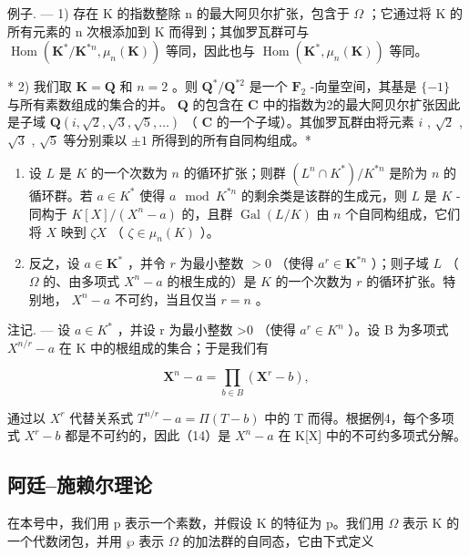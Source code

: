 例子. --- 1) 存在 K 的指数整除 n 的最大阿贝尔扩张，包含于 \(\Omega\) ；它通过将 K 的所有元素的 n 次根添加到 K 而得到；其伽罗瓦群可与 \(\operatorname{Hom}(\mathbf{K}^{*}/\mathbf{K}^{*n}, \mu_{n}(\mathbf{K}))\) 等同，因此也与 \(\operatorname{Hom}(\mathbf{K}^{*}, \mu_{n}(\mathbf{K}))\) 等同。

* 2) 我们取 \(\mathbf{K} = \mathbf{Q}\) 和 \(n = 2\) 。则 \(\mathbf{Q}^{*}/\mathbf{Q}^{*2}\) 是一个 \(\mathbf{F}_{2}\) -向量空间，其基是 \(\{-1\}\) 与所有素数组成的集合的并。 \(\mathbf{Q}\) 的包含在 \(\mathbf{C}\) 中的指数为2的最大阿贝尔扩张因此是子域 \(\mathbf{Q}(i, \sqrt{2}, \sqrt{3}, \sqrt{5}, \ldots)\) （ \(\mathbf{C}\) 的一个子域）。其伽罗瓦群由将元素 \(i\) , \(\sqrt{2}\) , \(\sqrt{3}\) , \(\sqrt{5}\) 等分别乘以 \(\pm 1\) 所得到的所有自同构组成。*

\begin{enumerate}
\def\labelenumi{\arabic{enumi})}
\setcounter{enumi}{2}
\item
  设 \(L\) 是 \(K\) 的一个次数为 \(n\) 的循环扩张；则群 \((L^n \cap K^*) / K^{*n}\) 是阶为 \(n\) 的循环群。若 \(a \in K^*\) 使得 \(a \mod K^{*n}\) 的剩余类是该群的生成元，则 \(L\) 是 \(K\) -同构于 \(K[X] / (X^n - a)\) 的，且群 \(\operatorname{Gal}(L / K)\) 由 \(n\) 个自同构组成，它们将 \(X\) 映到 \(\zeta X\) （ \(\zeta \in \mu_n(K)\) ）。
\item
  反之，设 \(a \in \mathbf{K}^*\) ，并令 \(r\) 为最小整数 \(> 0\) （使得 \(a^r \in \mathbf{K}^{*n}\) ）；则子域 \(L\) （ \(\Omega\) 的、由多项式 \(X^n - a\) 的根生成的）是 \(K\) 的一个次数为 \(r\) 的循环扩张。特别地， \(X^n - a\) 不可约，当且仅当 \(r = n\) 。
\end{enumerate}

注记. --- 设 \(a \in K^{*}\) ，并设 r 为最小整数 \textgreater0 （使得 \(a^{r} \in K^{n}\) ）。设 B 为多项式 \(X^{n/r} - a\) 在 K 中的根组成的集合；于是我们有

\[
\mathbf {X} ^ {n} - a = \prod_ {b \in B} \left(\mathbf {X} ^ {r} - b\right),\tag{14}
\]

通过以 \(X^{r}\) 代替关系式 \(T^{n/r}-a=\Pi(T-b)\) 中的 T 而得。根据例4，每个多项式 \(X^{r}-b\) 都是不可约的，因此（14）是 \(X^{n}-a\) 在 K{[}X{]} 中的不可约多项式分解。

\subsection{阿廷–施赖尔理论}

在本号中，我们用 p 表示一个素数，并假设 K 的特征为 p。我们用 \(\Omega\) 表示 K 的一个代数闭包，并用 \(\wp\) 表示 \(\Omega\) 的加法群的自同态，它由下式定义

